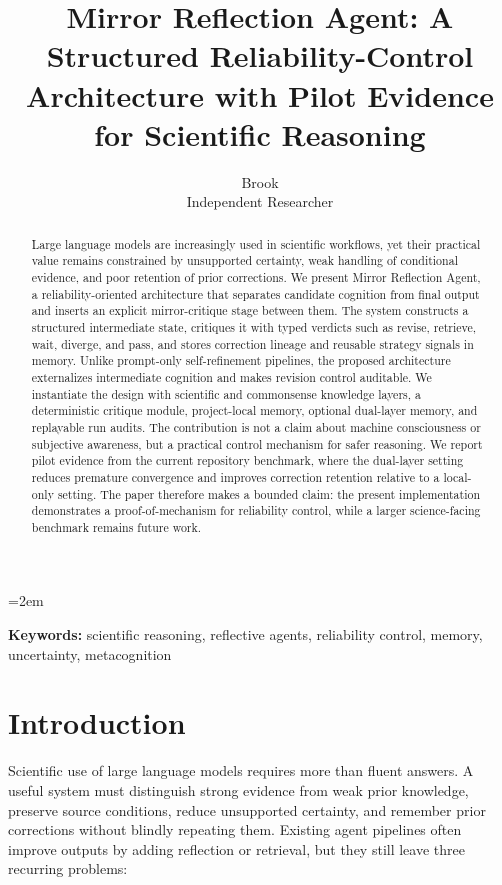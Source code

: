 \documentclass[12pt]{article}
\title{\textbf{Mirror Reflection Agent: A Structured Reliability-Control Architecture with Pilot Evidence for Scientific Reasoning}}
\author{Brook \\ Independent Researcher}
\date{}
\begin{document}
\maketitle
\onehalfspacing
\emergencystretch=2em

\begin{abstract}
Large language models are increasingly used in scientific workflows, yet their practical value remains constrained by unsupported certainty, weak handling of conditional evidence, and poor retention of prior corrections. We present Mirror Reflection Agent, a reliability-oriented architecture that separates candidate cognition from final output and inserts an explicit mirror-critique stage between them. The system constructs a structured intermediate state, critiques it with typed verdicts such as revise, retrieve, wait, diverge, and pass, and stores correction lineage and reusable strategy signals in memory. Unlike prompt-only self-refinement pipelines, the proposed architecture externalizes intermediate cognition and makes revision control auditable. We instantiate the design with scientific and commonsense knowledge layers, a deterministic critique module, project-local memory, optional dual-layer memory, and replayable run audits. The contribution is not a claim about machine consciousness or subjective awareness, but a practical control mechanism for safer reasoning. We report pilot evidence from the current repository benchmark, where the dual-layer setting reduces premature convergence and improves correction retention relative to a local-only setting. The paper therefore makes a bounded claim: the present implementation demonstrates a proof-of-mechanism for reliability control, while a larger science-facing benchmark remains future work.
\end{abstract}

\noindent\textbf{Keywords:} scientific reasoning, reflective agents, reliability control, memory, uncertainty, metacognition

\section{Introduction}

Scientific use of large language models requires more than fluent answers. A useful system must distinguish strong evidence from weak prior knowledge, preserve source conditions, reduce unsupported certainty, and remember prior corrections without blindly repeating them. Existing agent pipelines often improve outputs by adding reflection or retrieval, but they still leave three recurring problems:
\end{document}
